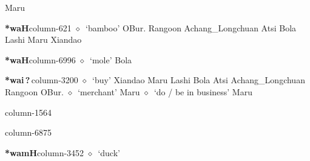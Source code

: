\hspace{1ex}
         Maru 
  \item {\footnotesize \textbf{*waH}}{\tiny column-621}
         $\diamond$~`bamboo'
         OBur. 
\hspace{1ex}
         Rangoon 
\hspace{1ex}
         Achang\_Longchuan 
\hspace{1ex}
         Atsi 
\hspace{1ex}
         Bola 
\hspace{1ex}
         Lashi 
\hspace{1ex}
         Maru 
\hspace{1ex}
         Xiandao 
  \item {\footnotesize \textbf{*waH}}{\tiny column-6996}
         $\diamond$~`mole'
         Bola 
  \item {\footnotesize \textbf{*wai\,?\,}}{\tiny column-3200}
         $\diamond$~`buy'
         Xiandao 
\hspace{1ex}
         Maru 
\hspace{1ex}
         Lashi 
\hspace{1ex}
         Bola 
\hspace{1ex}
         Atsi 
\hspace{1ex}
         Achang\_Longchuan 
\hspace{1ex}
         Rangoon 
\hspace{1ex}
         OBur. 
\hspace{1ex}
         $\diamond$~`merchant'
         Maru 
\hspace{1ex}
         $\diamond$~`do / be in business'
         Maru 
  \item {\footnotesize \textbf{}}{\tiny column-1564}
  \item {\footnotesize \textbf{}}{\tiny column-6875}
  \item {\footnotesize \textbf{*wamH}}{\tiny column-3452}
         $\diamond$~`duck'
